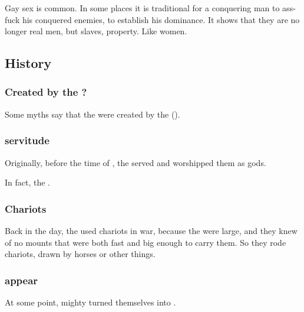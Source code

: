 Gay sex is common. 
In some places it is traditional for a conquering man to ass-fuck his conquered enemies, to establish his dominance. 
It shows that they are no longer real men, but slaves, property. 
Like women. 









\subsection{History}





\subsubsection{Created by the \voyagers?}
Some myths say that the \nephilim were created by the \voyagers (). 





\subsubsection{\Ophidian{} servitude}
Originally, before the time of \Kserasshana, the \nephilim{} served  \ophidians{} and worshipped them as gods. 

In fact, the \ophidians{} . 





\subsubsection{Chariots}
Back in the day, the \nephilim{} used chariots in war, because the \nephilim{} were large, and they knew of no mounts that were both fast and big enough to carry them. So they rode chariots, drawn by horses or other things.





\subsubsection{\Aryothim{} appear}
At some point, mighty \nephilim{} turned themselves into . 





